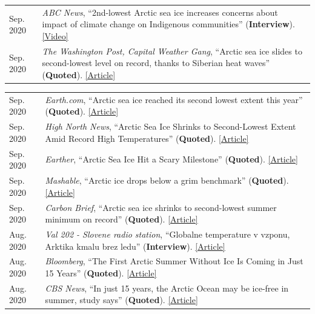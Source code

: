 \documentclass[margin,line,palatino,courier,10pt]{res}
\begin{document}
\begin{resume}
\begin{tabular}{@{}p{0.9in}p{4in}}
Sep. 2020 & \textit{ABC News}, ``2nd-lowest Arctic sea ice increases concerns about impact of climate change on Indigenous communities'' (\textbf{Interview}). \href{https://abcnews.go.com/International/2nd-lowest-arctic-sea-ice-increases-concerns-impact/story?id=73224755}{[Video]}\\
Sep. 2020 & \textit{The Washington Post, Capital Weather Gang}, ``Arctic sea ice slides to second-lowest level on record, thanks to Siberian heat waves'' (\textbf{Quoted}). \href{https://www.washingtonpost.com/weather/2020/09/22/arctic-sea-ice-low/}{[Article]}\\
\end{tabular}
\begin{tabular}{@{}p{0.9in}p{4in}}
Sep. 2020 & \textit{Earth.com}, ``Arctic sea ice reached its second lowest extent this year'' (\textbf{Quoted}). \href{https://www.earth.com/news/arctic-sea-ice-reached-its-second-lowest-extent-this-year/}{[Article]}\\
Sep. 2020 & \textit{High North News}, ``Arctic Sea Ice Shrinks to Second-Lowest Extent Amid Record High Temperatures'' (\textbf{Quoted}). \href{https://www.highnorthnews.com/en/arctic-sea-ice-shrinks-second-lowest-extent-amid-record-high-temperatures}{[Article]}\\
Sep. 2020 & \textit{Earther}, ``Arctic Sea Ice Hit a Scary Milestone'' (\textbf{Quoted}). \href{https://earther.gizmodo.com/arctic-sea-ice-hit-a-scary-milestone-1845133739}{[Article]}\\
Sep. 2020 & \textit{Mashable}, ``Arctic ice drops below a grim benchmark'' (\textbf{Quoted}). \href{https://mashable.com/article/arctic-sea-ice-decline-2020/}{[Article]}\\
Sep. 2020 & \textit{Carbon Brief}, ``Arctic sea ice shrinks to second-lowest summer minimum on record'' (\textbf{Quoted}). \href{https://www.carbonbrief.org/arctic-sea-ice-shrinks-to-second-lowest-summer-minimum-on-record}{[Article]}\\
Aug. 2020 & \textit{Val 202 - Slovene radio station}, ``Globalne temperature v vzponu, Arktika kmalu brez ledu'' (\textbf{Interview}). \href{https://val202.rtvslo.si/2020/08/aktualno-20/}{[Article]}\\
Aug. 2020 & \textit{Bloomberg}, ``The First Arctic Summer Without Ice Is Coming in Just 15 Years'' (\textbf{Quoted}). \href{https://www.bloomberg.com/news/articles/2020-08-17/the-first-arctic-summer-without-ice-is-coming-in-just-15-years?srnd=premium}{[Article]}\\
Aug. 2020 & \textit{CBS News}, ``In just 15 years, the Arctic Ocean may be ice-free in summer, study says'' (\textbf{Quoted}). \href{https://www.cbsnews.com/news/arctic-ocean-climate-change-ice-free-15-years/}{[Article]}\\

\end{tabular}
\end{resume}
\end{document}
